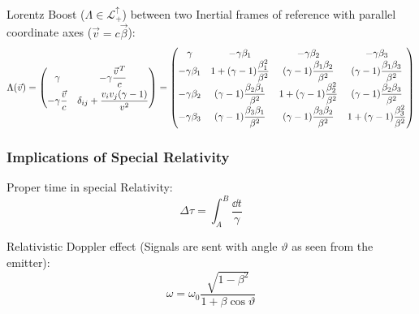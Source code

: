			\noindent
			Lorentz Boost ($\Lambda\in\mathcal{L}^\uparrow_+$) between two Inertial frames of reference with parallel coordinate axes ($\vec{v}=c\vec{\beta}$):%
			\begin{equation}
				\Lambda(\vec{v}) = \left( \begin{matrix}
					\gamma & -\gamma\dfrac{\pvec{v}^T}{c} \\[6pt]
					-\gamma\dfrac{\vec{v}}{c} & \delta_{ij}+\dfrac{v_i v_j(\gamma-1)}{v^2}
					\end{matrix} \right)
					=
					\left(\begin{matrix}
						\gamma & -\gamma \beta_1 & -\gamma \beta_2 & -\gamma \beta_3 \\
						-\gamma \beta_1 & 1+(\gamma -1){\dfrac {\beta_1^{2}}{\beta^{2}}} & (\gamma -1){\dfrac {\beta_1 \beta_2}{\beta^{2}}}&(\gamma -1){\dfrac {\beta_1\beta_3}{\beta^{2}}} \\
						-\gamma \beta_2 & (\gamma -1){\dfrac {\beta_2\beta_1}{\beta^{2}}} & 1+(\gamma -1){\dfrac {\beta_2^{2}}{\beta^{2}}}&(\gamma -1){\dfrac {\beta_2 \beta_3}{\beta^{2}}} \\
						-\gamma \beta_3 &(\gamma -1){\dfrac {\beta_3\beta_1}{\beta^{2}}}&(\gamma -1){\dfrac {\beta_3\beta_2}{\beta^{2}}}&1+(\gamma -1){\dfrac {\beta_3^{2}}{\beta^{2}}}
					\end{matrix}\right)
			\end{equation}

		\subsubsection{Implications of Special Relativity}
			\noindent
			Proper time in special Relativity:%
			\begin{equation}
				\Delta\tau = \int_A^B \frac{\dd t}{\gamma}
			\end{equation}

			\noindent
			Relativistic Doppler effect (Signals are sent with angle $\vartheta$ as seen from the emitter):%
			\begin{equation}
				\omega = \omega_0\frac{\sqrt{1-\beta^2}}{1+\beta\cos\vartheta}
			\end{equation}

